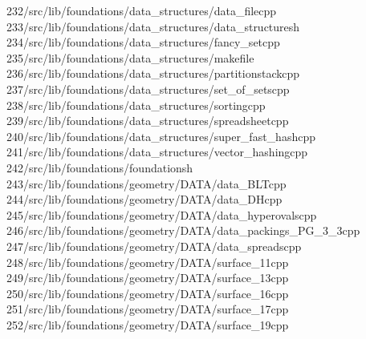 \begin{tabbing}
232\>/src/lib/foundations/data\_structures/data\_filecpp\\[0pt]
233\>/src/lib/foundations/data\_structures/data\_structuresh\\[0pt]
234\>/src/lib/foundations/data\_structures/fancy\_setcpp\\[0pt]
235\>/src/lib/foundations/data\_structures/makefile\\[0pt]
236\>/src/lib/foundations/data\_structures/partitionstackcpp\\[0pt]
237\>/src/lib/foundations/data\_structures/set\_of\_setscpp\\[0pt]
238\>/src/lib/foundations/data\_structures/sortingcpp\\[0pt]
239\>/src/lib/foundations/data\_structures/spreadsheetcpp\\[0pt]
240\>/src/lib/foundations/data\_structures/super\_fast\_hashcpp\\[0pt]
241\>/src/lib/foundations/data\_structures/vector\_hashingcpp\\[0pt]
242\>/src/lib/foundations/foundationsh\\[0pt]
243\>/src/lib/foundations/geometry/DATA/data\_BLTcpp\\[0pt]
244\>/src/lib/foundations/geometry/DATA/data\_DHcpp\\[0pt]
245\>/src/lib/foundations/geometry/DATA/data\_hyperovalscpp\\[0pt]
246\>/src/lib/foundations/geometry/DATA/data\_packings\_PG\_3\_3cpp\\[0pt]
247\>/src/lib/foundations/geometry/DATA/data\_spreadscpp\\[0pt]
248\>/src/lib/foundations/geometry/DATA/surface\_11cpp\\[0pt]
249\>/src/lib/foundations/geometry/DATA/surface\_13cpp\\[0pt]
250\>/src/lib/foundations/geometry/DATA/surface\_16cpp\\[0pt]
251\>/src/lib/foundations/geometry/DATA/surface\_17cpp\\[0pt]
252\>/src/lib/foundations/geometry/DATA/surface\_19cpp\\[0pt]

\end{tabbing}
